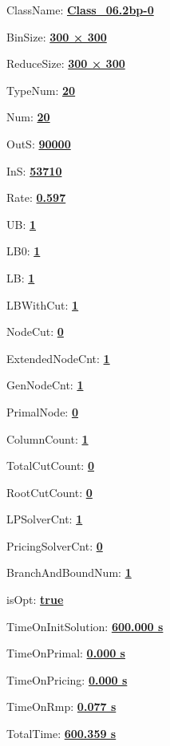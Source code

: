 \documentclass[11pt]{article}
\begin{document}
\pagestyle{empty}


ClassName: \underline{\textbf{Class_06.2bp-0}}
\par
BinSize: \underline{\textbf{300 × 300}}
\par
ReduceSize: \underline{\textbf{300 × 300}}
\par
TypeNum: \underline{\textbf{20}}
\par
Num: \underline{\textbf{20}}
\par
OutS: \underline{\textbf{90000}}
\par
InS: \underline{\textbf{53710}}
\par
Rate: \underline{\textbf{0.597}}
\par
UB: \underline{\textbf{1}}
\par
LB0: \underline{\textbf{1}}
\par
LB: \underline{\textbf{1}}
\par
LBWithCut: \underline{\textbf{1}}
\par
NodeCut: \underline{\textbf{0}}
\par
ExtendedNodeCnt: \underline{\textbf{1}}
\par
GenNodeCnt: \underline{\textbf{1}}
\par
PrimalNode: \underline{\textbf{0}}
\par
ColumnCount: \underline{\textbf{1}}
\par
TotalCutCount: \underline{\textbf{0}}
\par
RootCutCount: \underline{\textbf{0}}
\par
LPSolverCnt: \underline{\textbf{1}}
\par
PricingSolverCnt: \underline{\textbf{0}}
\par
BranchAndBoundNum: \underline{\textbf{1}}
\par
isOpt: \underline{\textbf{true}}
\par
TimeOnInitSolution: \underline{\textbf{600.000 s}}
\par
TimeOnPrimal: \underline{\textbf{0.000 s}}
\par
TimeOnPricing: \underline{\textbf{0.000 s}}
\par
TimeOnRmp: \underline{\textbf{0.077 s}}
\par
TotalTime: \underline{\textbf{600.359 s}}
\par
\newpage
\end{document}
